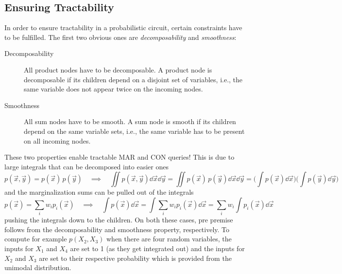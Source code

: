 		\subsection{Ensuring Tractability}
			\label{subsec:probCircTractability}

			In order to ensure tractability in a probabilistic circuit, certain constraints have to be fulfilled. The first two obvious ones are \emph{decomposability} and \emph{smoothness}:
			\begin{description}
				\item[Decomposability] All product nodes have to be decomposable. A product node is decomposable if its children depend on a disjoint set of variables, i.e., the same variable does not appear twice on the incoming nodes.
				\item[Smoothness] All sum nodes have to be smooth. A sum node is smooth if its children depend on the same variable sets, i.e., the same variable has to be present on all incoming nodes.
			\end{description}
			These two properties enable tractable MAR and CON queries! This is due to large integrals that can be decomposed into easier ones
			\begin{equation}
				p(\vec{x}, \vec{y}) = p(\vec{x}) \, p(\vec{y})
				\quad\implies\quad
				\iint\! p(\vec{x}, \vec{y}) \dd{\vec{x}} \dd{\vec{y}}
					= \iint\! p(\vec{x}) \, p(\vec{y}) \dd{\vec{x}} \dd{\vec{y}}
					= \bigg(\! \int\! p(\vec{x}) \dd{\vec{x}} \!\!\bigg) \bigg(\! \int\! p(\vec{y}) \dd{\vec{y}} \!\!\bigg)
			\end{equation}
			and the marginalization sums can be pulled out of the integrals
			\begin{equation}
				p(\vec{x}) = \sum_i w_i p_i(\vec{x})
				\quad\implies\quad
				\int\! p(\vec{x}) \dd{\vec{x}}
					= \int \sum_i w_i p_i(\vec{x}) \dd{\vec{x}}
					= \sum_i w_i \int\! p_i(\vec{x}) \dd{\vec{x}}
			\end{equation}
			pushing the integrals down to the children. On both these cases, pre premise follows from the decomposability and smoothness property, respectively. To compute for example \( p(X_2, X_3) \) when there are four random variables, the inputs for \( X_1 \) and \( X_4 \) are set to \num{1} (as they get integrated out) and the inputs for \( X_2 \) and \( X_3 \) are set to their respective probability which is provided from the unimodal distribution.

